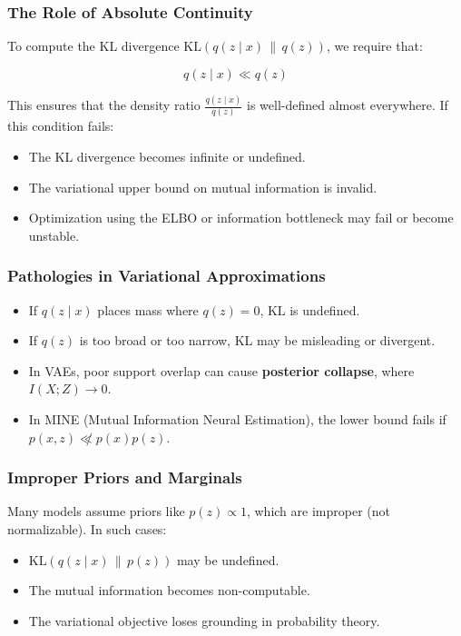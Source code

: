 \subsubsection{The Role of Absolute Continuity}

To compute the KL divergence \( \mathrm{KL}(q(z \mid x) \,\|\, q(z)) \), we require that:

\[
q(z \mid x) \ll q(z)
\]

This ensures that the density ratio \( \frac{q(z \mid x)}{q(z)} \) is well-defined almost everywhere. If this condition fails:

\begin{itemize}
    \item The KL divergence becomes infinite or undefined.
    \item The variational upper bound on mutual information is invalid.
    \item Optimization using the ELBO or information bottleneck may fail or become unstable.
\end{itemize}

\subsubsection{Pathologies in Variational Approximations}

\begin{itemize}
    \item If \( q(z \mid x) \) places mass where \( q(z) = 0 \), KL is undefined.
    \item If \( q(z) \) is too broad or too narrow, KL may be misleading or divergent.
    \item In VAEs, poor support overlap can cause \textbf{posterior collapse}, where \( I(X; Z) \to 0 \).
    \item In MINE (Mutual Information Neural Estimation), the lower bound fails if \( p(x, z) \not\ll p(x)p(z) \).
\end{itemize}

\subsubsection{Improper Priors and Marginals}

Many models assume priors like \( p(z) \propto 1 \), which are improper (not normalizable). In such cases:

\begin{itemize}
    \item \( \mathrm{KL}(q(z \mid x) \,\|\, p(z)) \) may be undefined.
    \item The mutual information becomes non-computable.
    \item The variational objective loses grounding in probability theory.
\end{itemize}

